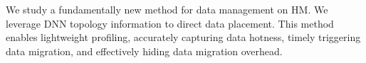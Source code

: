 We study a fundamentally new method for data management on HM. %
We %
\textcolor{check}{leverage DNN topology information }to direct data placement. This method enables lightweight profiling, accurately capturing data hotness, timely triggering data migration, and effectively hiding data migration overhead. 





\begin{comment}
For instance, multi-GPU systems have been explored
when the batch and model parameters do not fit in the memory of a single GPU. The solution has been to reduce the batch size and make it fit in memory. But this changes the batch size and alters the convergence
\end{comment}